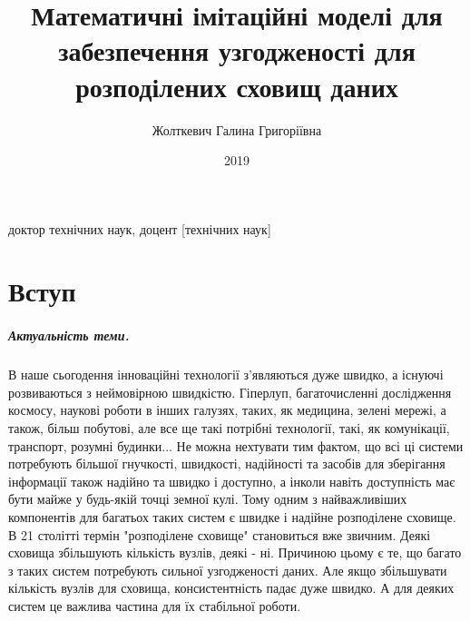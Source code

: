 \documentclass[14pt]{vakthesis}
\begin{document}

\title{Математичні імітаційні моделі для забезпечення узгодженості для розподілених сховищ даних}
\author{Жолткевич Галина Григоріївна}
           {доктор технічних наук, доцент}
[технічних наук]
\date{2019}

\maketitle

\tableofcontents

\chapter*{Вступ}

\paragraph{\bfseries Актуальність теми.}

В наше сьогодення інноваційні технології з'являються дуже швидко, а існуючі розвиваються з неймовірною швидкістю. Гіперлуп, багаточисленні дослідження космосу, наукові роботи в інших галузях, таких, 
як медицина, зелені мережі, а також, більш побутові, але все ще такі потрібні технології, такі, як 
комунікації, транспорт, розумні будинки... Не можна нехтувати тим фактом, що всі ці системи потребують
більшої гнучкості, швидкості, надійності та засобів для зберігання інформації також надійно та швидко і доступно, а інколи навіть доступність має бути майже у будь-якій точці земної кулі.
Тому одним з найважливіших компонентів для багатьох таких систем є швидке і надійне розподілене сховище.
В 21 столітті термін "розподілене сховище" становиться вже звичним. Деякі сховища збільшують кількість вузлів, деякі - ні. Причиною цьому є те, що багато з таких систем потребують сильної узгодженості даних. Але якщо збільшувати кількість вузлів для сховища, консистентність падає дуже швидко. А для деяких систем це важлива частина для їх стабільної роботи.
\end{document}
